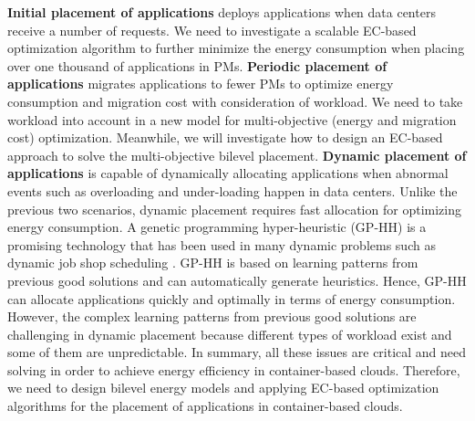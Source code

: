   \textbf{Initial placement of applications} deploys applications when data centers receive a number of requests. We need to investigate a scalable EC-based optimization algorithm to further minimize the energy consumption when placing over one thousand of applications in PMs. 
\textbf{Periodic placement of applications} migrates applications to fewer PMs to optimize energy consumption and migration cost with consideration of workload. We need to take workload into account in a new model for multi-objective (energy and migration cost) optimization. 
Meanwhile, we will investigate how to design an EC-based approach to solve the multi-objective bilevel placement. 
\textbf{Dynamic placement of applications} is capable of dynamically allocating applications when abnormal events such as overloading and under-loading \cite{Beloglazov:2013ht} happen in data centers. Unlike the previous two scenarios, dynamic placement requires fast allocation for optimizing energy consumption. A genetic programming \cite{Banzhaf:1998wc} hyper-heuristic (GP-HH) is a promising technology that
has been used in many dynamic problems such as dynamic job shop scheduling \cite{Nguyen:2014eu}. GP-HH is based on learning patterns from previous good solutions and can automatically generate heuristics. Hence,  GP-HH can allocate applications quickly and optimally in terms of energy consumption. However, the complex learning patterns from previous good solutions are challenging in dynamic placement because different types of workload exist and some of them are unpredictable. In summary, all these issues are critical and need solving in order to achieve energy efficiency in container-based clouds. Therefore, we need to design bilevel energy models and applying EC-based optimization algorithms for the placement of applications in container-based clouds. 



